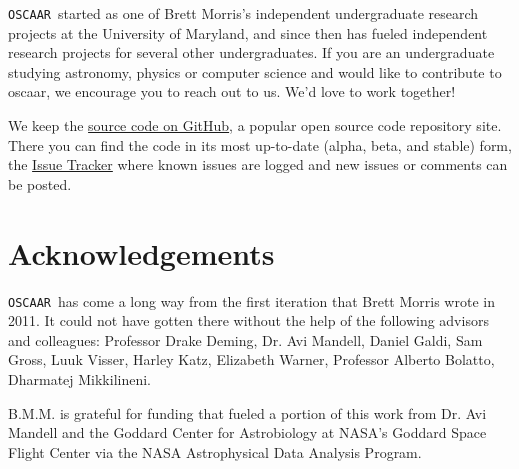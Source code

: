 \documentclass[a4paper]{article}
\newcommand{\code}[1]{\texttt{#1}}
\newcommand{\oscaar}{\code{OSCAAR}~}
\begin{document}
\oscaar started as one of Brett Morris's independent undergraduate research projects at the University of Maryland, and since then has fueled independent research projects for several other undergraduates. If you are an undergraduate studying astronomy, physics or computer science and would like to contribute to oscaar, we encourage you to reach out to us. We'd love to work together! 

We keep the \href{https://github.com/OSCAAR/OSCAAR}{source code on GitHub}, a popular open source code repository site. There you can find the code in its most up-to-date (alpha, beta, and stable) form, the \href{https://github.com/OSCAAR/OSCAAR/issues?state=open}{Issue Tracker} where known issues are logged and new issues or comments can be posted.


\section{Acknowledgements}
\oscaar has come a long way from the first iteration that Brett Morris wrote in 2011. It could not have gotten there without the help of the following advisors and colleagues: 
Professor Drake Deming, Dr. Avi Mandell, Daniel Galdi, Sam Gross, Luuk Visser, Harley Katz, Elizabeth Warner, Professor Alberto Bolatto, Dharmatej Mikkilineni.

B.M.M. is grateful for funding that fueled a portion of this work from Dr. Avi Mandell and the Goddard Center for Astrobiology at NASA's Goddard Space Flight Center via the NASA Astrophysical Data Analysis Program. 
\end{document}
